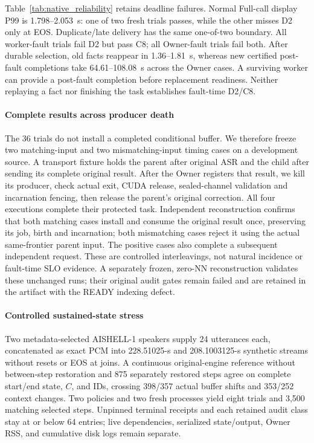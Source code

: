 Table~\ref{tab:native_reliability} retains deadline failures. Normal
Full-call display P99 is 1.798--2.053~s: one of two fresh trials passes,
while the other misses D2 only at EOS. Duplicate/late delivery has the
same one-of-two boundary. All worker-fault trials fail D2 but pass C8;
all Owner-fault trials fail both. After durable selection, old facts
reappear in 1.36--1.81~s, whereas new certified post-fault completions
take 64.61--108.08~s across the Owner cases. A surviving worker can
provide a post-fault completion before replacement readiness. Neither
replaying a fact nor finishing the task establishes fault-time D2/C8.

\paragraph{Complete results across producer death}
The 36 trials do not install a completed conditional buffer. We therefore
freeze two matching-input and two mismatching-input timing cases on a
development source. A transport fixture holds the parent after original
ASR and the child after sending its complete original result. After
the Owner registers that result, we kill its producer, check actual
exit, CUDA release, sealed-channel validation and incarnation fencing,
then release the parent's original correction. All four executions
complete their protected task. Independent reconstruction confirms that
both matching cases install and consume the original result once,
preserving its job, birth and incarnation; both mismatching cases reject
it using the actual same-frontier parent input. The positive cases also
complete a subsequent independent request. These are controlled
interleavings, not natural incidence or fault-time SLO evidence.
A separately frozen, zero-NN reconstruction validates these unchanged
runs; their original audit gates remain failed and are retained in the
artifact with the READY indexing defect.

\paragraph{Controlled sustained-state stress}
Two metadata-selected AISHELL-1 speakers supply 24 utterances each,
concatenated as exact PCM into 228.51025-s and 208.1003125-s synthetic
streams without resets or EOS at joins. A continuous original-engine
reference without between-step restoration and 875 separately restored
steps agree on complete start/end state, $C$, and IDs, crossing 398/357
actual buffer shifts and 353/252 context changes. Two policies and two
fresh processes yield eight trials and 3,500 matching selected steps.
Unpinned terminal receipts and each retained audit class stay at or
below 64 entries; live dependencies, serialized state/output, Owner RSS,
and cumulative disk logs remain separate.

